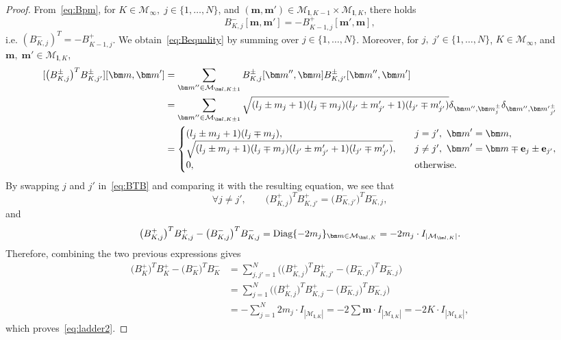 \documentclass{article}
\newcommand{\card}[1]{|{#1}|}
\numberwithin{equation}{section}
\def\bl{{\bm l}}
\def\bbm{{\bm m}}
\def\calM{\mathcal{M}}
\def\Nat{{N}}
\def\Bpm{B^{\pm}}
\def\Bp{B^{+}}
\def\Bm{B^{-}}
\begin{document}
\begin{proof}
From~\eqref{eq:Bpm}, for $K\in \calM_\infty,\;j\in \{1,\ldots, \Nat\}$, and $(\bbm,\bbm')\in\calM_{\bl,K-1}\times\calM_{\bl,K}$, there holds
\[
    \Bm_{K,j}[\bbm,\bbm'] = -\Bp_{K-1,j}[\bbm',\bbm],
\]
i.e.
    $(\Bm_{K,j})^T=-\Bp_{K-1,j}$.
We obtain~\eqref{eq:Bequality} by summing over $j\in\{1,\ldots, \Nat\}$.
Moreover, for $j,\;j'\in \{1,\ldots, \Nat\}$, $K\in \calM_\infty$, and $\bbm, \;\bbm'\in\calM_{\bl,K}$, 
\begin{equation}\label{eq:BTB}
\begin{split}
    [\big(\Bpm_{K,j}\big)^T \Bpm_{K,j'}][\bbm,\bbm']
    &= 
    \sum_{\bbm''\in\calM_{\bl,K\pm 1}}\Bpm_{K,j}[\bbm'',\bbm]\Bpm_{K,j'}[\bbm'',\bbm'] \\
    &= 
    \sum_{\bbm''\in\calM_{\bl,K\pm 1}}
    \sqrt{(l_j\pm m_j+1)(l_j\mp m_j)(l_{j'}\pm m'_{j'}+1)(l_{j'}\mp m'_{j'})}\delta_{\bbm'',\bbm_j^\pm}\delta_{\bbm'',{\bbm'}_{j'}^\pm}\\
    &= \begin{cases}
        (l_j\pm m_j+1)(l_j\mp m_j),
        \quad &j=j', ~\bbm' = \bbm, \\
        \sqrt{(l_j\pm m_j+1)(l_j\mp m_j)(l_{j'}\pm m'_{j'}+1)(l_{j'}\mp m'_{j'})},
        \quad &j\ne j', ~\bbm'=\bbm\mp{\bf e}_j\pm{\bf e}_{j'}, \\
        0, \qquad &\textup{otherwise.}
    \end{cases}
\end{split}
\end{equation}
By swapping $j$ and $j'$ in~\eqref{eq:BTB} and comparing it with the resulting equation, we see that
    \[
        \forall j\ne j', \qquad \big(\Bp_{K,j})^T \Bp_{K,j'} = \big(\Bm_{K,j'}\big)^T \Bm_{K,j},
    \]
    and
    \[
        \big(\Bp_{K,j}\big)^T\Bp_{K,j} - \big(\Bm_{K,j}\big)^T \Bm_{K,j} = \textup{Diag}\{-2m_j\}_{\bbm\in\calM_{\bl,K}} = -2m_j \cdot I_{\card{\calM_{\bl,K}}}.
    \]
Therefore, combining the two previous expressions gives
\begin{align*}
    \big(\Bp_K\big)^T\Bp_K  - \big(\Bm_K\big)^T\Bm_K 
    & = 
 \sum_{j,j'=1}^N 
            \Big( \big(\Bp_{K,j}\big)^T
            \Bp_{K,j'}
             - \big(\Bm_{K,j'}\big)^T \Bm_{K,j} \Big)
             \nonumber \\
        &= \sum_{j=1}^N 
            \Big( \big(\Bp_{K,j}\big)^T \Bp_{K,j}
             - \big(\Bm_{K,j}\big)^T \Bm_{K,j} \Big) \nonumber \\
        &= -\sum_{j=1}^N 2m_j\cdot I_{\card{\calM_{\bl,K}}} = -2\sum\bbm \cdot I_{\card{\calM_{\bl,K}}} = -2K\cdot I_{\card{\calM_{\bl,K}}},
\end{align*}
which proves~\eqref{eq:ladder2}.
\end{proof}
\end{document}
